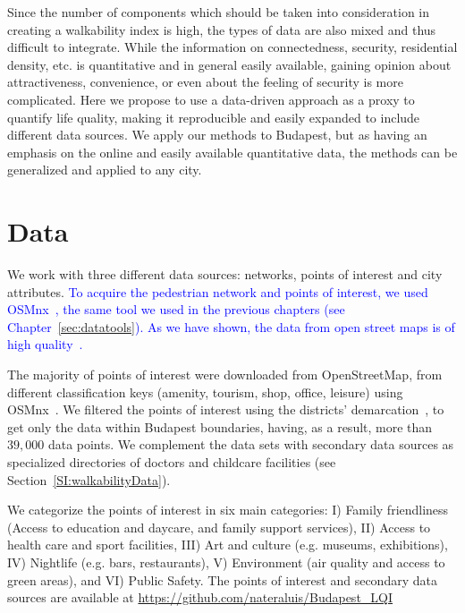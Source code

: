 Since the number of components which should be taken into consideration in creating a walkability index is high, the types of data are also mixed and thus difficult to integrate. While the information on connectedness, security, residential density, etc. is quantitative and in general easily available, gaining opinion about attractiveness, convenience, or even about the feeling of security is more complicated. Here we propose to use a data-driven approach as a proxy to quantify life quality, making it reproducible and easily expanded to include different data sources. We apply our methods to Budapest, but as having an emphasis on the online and easily available quantitative data, the methods can be generalized and applied to any city.

\section{Data}
We work with three different data sources: networks, points of interest and city attributes. \textcolor{blue}{To acquire the pedestrian network and points of interest, we used OSMnx~\cite{boeing2017osmnx}, the same tool we used in the previous chapters (see Chapter~\ref{sec:datatools}). As we have shown, the data from open street maps is of high quality~\cite{haklay2010openstreetmap,girres2010quality,Ferster2019Bicycle,barbosa2018human}.}%

The majority of points of interest were downloaded from OpenStreetMap, from different classification keys (amenity, tourism, shop, office, leisure) using OSMnx~\cite{boeing2017osmnx}. We filtered the points of interest using the districts' demarcation~\cite{HU2019Districts}, to get only the data within Budapest boundaries, having, as a result, more than $39,000$ data points. We complement the data sets with secondary data sources as specialized directories of doctors and childcare facilities (see Section~\ref{SI:walkabilityData}).

We categorize the points of interest in six main categories: I) Family friendliness (Access to education and daycare, and family support services), II) Access to health care and sport facilities, III) Art and culture (e.g. museums, exhibitions), IV) Nightlife (e.g. bars, restaurants), V) Environment (air quality and access to green areas), and VI) Public Safety. The points of interest and secondary data sources are available at \url{https://github.com/nateraluis/Budapest_LQI}


